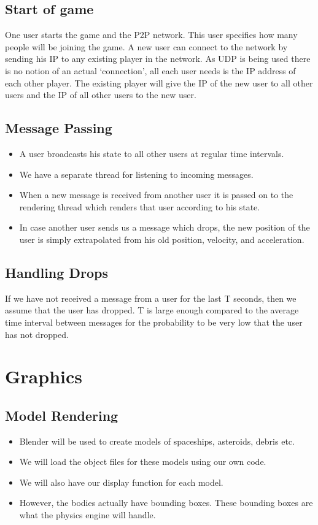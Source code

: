 \documentclass[]{article}
\begin{document}
\subsection{Start of game}
One user starts the game and the P2P network. This user specifies how many people will be joining the game. A new user can connect to the network by sending his IP to any existing player in the network. As UDP is being used there is no notion of an actual `connection', all each user needs is the IP address of each other player. The existing player will give the IP of the new user to all other users and the IP of all other users to the new user.
\subsection{Message Passing}
\begin{itemize}
\item A user broadcasts his state to all other users at regular time intervals.
\item We have a separate thread for listening to incoming messages. 
\item When a new message is received from another user it is passed on to the rendering thread which renders that user according to his state.
\item In case another user sends us a message which drops, the new position of the user is simply extrapolated from his old position, velocity, and acceleration.
\end{itemize}
\subsection{Handling Drops}
If we have not received a message from a user for the last T seconds, then we assume that the user has dropped. T is large enough compared to the average time interval between messages for the probability to be very low that the user has not dropped.




\section{Graphics}
\subsection{Model Rendering}
\begin{itemize}
\item Blender will be used to create models of spaceships, asteroids, debris etc.
\item We will load the object files for these models using our own code.
\item We will also have our display function for each model.
\item However, the bodies actually have bounding boxes. These bounding boxes are what the physics engine will handle.
\end{itemize}

\end{document}
